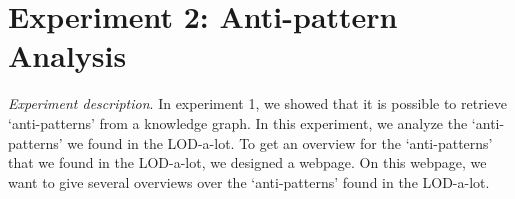 \documentclass[11pt,letterpaper ,oneside ]{book}
\begin{document}
	
	\section{Experiment 2: Anti-pattern Analysis} %
	\textit{Experiment description}. In experiment 1, we showed that it is possible to retrieve `anti-patterns' from a knowledge graph. In this experiment, we analyze the `anti-patterns' we found in the LOD-a-lot. To get an overview for the `anti-patterns' that we found in the LOD-a-lot, we designed a webpage. On this webpage, we want to give several overviews over the `anti-patterns' found in the LOD-a-lot.
	
	\begin{figure}[!t]
	\end{figure}
	
\end{document}
